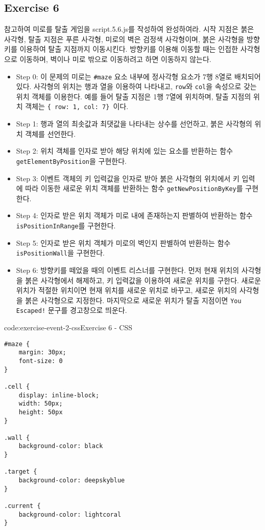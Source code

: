 \subsection*{Exercise 6}

\와 \를 참고하여 미로를 탈출 게임을 script.5.6.js를 작성하여 완성하여라. 시작 지점은 붉은 사각형, 탈출 지점은 푸른 사각형, 미로의 벽은 검정색 사각형이며, 붉은 사각형을 방향키를 이용하여 탈출 지점까지 이동시킨다. 방향키를 이용해 이동할 때는 인접한 사각형으로 이동하며, 벽이나 미로 밖으로 이동하려고 하면 이동하지 않는다.

\begin{itemize}
    \item Step 0: 이 문제의 미로는 \texttt{\#maze} 요소 내부에 정사각형 요소가 7행 8열로 배치되어 있다. 사각형의 위치는 행과 열을 이용하여 나타내고, \texttt{row}와 \texttt{col}을 속성으로 갖는 위치 객체를 이용한다. 예를 들어 탈출 지점은 1행 7열에 위치하며, 탈출 지점의 위치 객체는 \texttt{\{ row: 1, col: 7\} }이다.
    \item Step 1: 행과 열의 최솟값과 최댓값을 나타내는 상수를 선언하고, 붉은 사각형의 위치 객체를 선언한다.
    \item Step 2: 위치 객체를 인자로 받아 해당 위치에 있는 요소를 반환하는 함수 \texttt{getElementByPosition}을 구현한다.
    \item Step 3: 이벤트 객체의 키 입력값을 인자로 받아 붉은 사각형의 위치에서 키 입력에 따라 이동한 새로운 위치 객체를 반환하는 함수 \texttt{getNewPositionByKey}를 구현한다.
    \item Step 4: 인자로 받은 위치 객체가 미로 내에 존재하는지 판별하여 반환하는 함수 \texttt{isPositionInRange}를 구현한다.
    \item Step 5: 인자로 받은 위치 객체가 미로의 벽인지 판별하여 반환하는 함수 \texttt{isPositionWall}을 구현한다.
    \item Step 6: 방향키를 떼었을 때의 이벤트 리스너를 구현한다. 먼저 현재 위치의 사각형을 붉은 사각형에서 해제하고, 키 입력값을 이용하여 새로운 위치를 구한다. 새로운 위치가 적절한 위치이면 현재 위치를 새로운 위치로 바꾸고, 새로운 위치의 사각형을 붉은 사각형으로 지정한다. 마지막으로 새로운 위치가 탈출 지점이면 \texttt{You Escaped!} 문구를 경고창으로 띄운다.
\end{itemize}

\begin{codeenv}{code:exercise-event-2-css}{Exercise 6 - CSS}\begin{verbatim}
#maze {
    margin: 30px;
    font-size: 0
}

.cell {
    display: inline-block;
    width: 50px;
    height: 50px
}

.wall {
    background-color: black
}

.target {
    background-color: deepskyblue
}

.current {
    background-color: lightcoral
}
\end{verbatim}
\end{codeenv}

